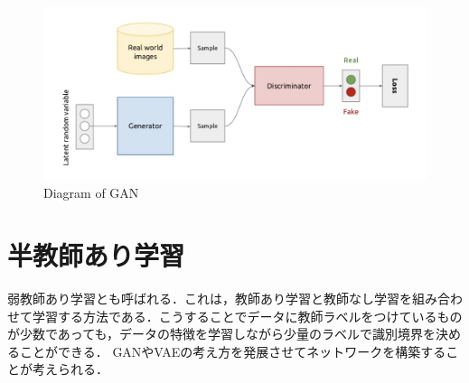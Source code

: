 \begin{figure}[H]
	\centering
	\includegraphics[width=0.7\linewidth]{fig/generative_adversarial_nets.png}
	\caption{Diagram of GAN}
	\label{fig:GAN}
\end{figure}

\section{半教師あり学習}
弱教師あり学習とも呼ばれる．これは，教師あり学習と教師なし学習を組み合わせて学習する方法である．こうすることでデータに教師ラベルをつけているものが少数であっても，データの特徴を学習しながら少量のラベルで識別境界を決めることができる．
GANやVAEの考え方を発展させてネットワークを構築することが考えられる．
